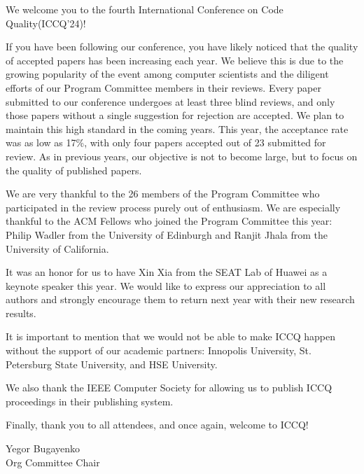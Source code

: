 \cleardoublepage
{}

We welcome you to the fourth International Conference on Code Quality(ICCQ'24)!

If you have been following our conference, you have likely noticed that the
quality of accepted papers has been increasing each year. We believe this is
due to the growing popularity of the event among computer scientists
and the diligent efforts of our Program Committee members in their reviews.
Every paper submitted to our conference undergoes at least three blind reviews,
and only those papers without a single suggestion for rejection are accepted.
We plan to maintain this high standard in the coming years. This year, the
acceptance rate was as low as 17\%, with only four papers accepted out of 23
submitted for review. As in previous years, our objective is not to become
large, but to focus on the quality of published papers.

We are very thankful to the 26 members of the Program Committee who participated
in the review process purely out of enthusiasm. We are especially thankful to
the ACM Fellows who joined the Program Committee this year: Philip Wadler from
the University of Edinburgh and Ranjit Jhala from the University of
California.

It was an honor for us to have Xin Xia from the SEAT Lab of Huawei as a keynote
speaker this year. We would like to express our appreciation to all authors and
strongly encourage them to return next year with their new research results.

It is important to mention that we would not be able to make ICCQ happen without
the support of our academic partners: Innopolis University, St. Petersburg
State University, and HSE University.

We also thank the IEEE Computer Society for allowing us to publish ICCQ
proceedings in their publishing system.

Finally, thank you to all attendees, and once again, welcome to ICCQ!

\vspace{18pt}
Yegor Bugayenko\\
Org Committee Chair
